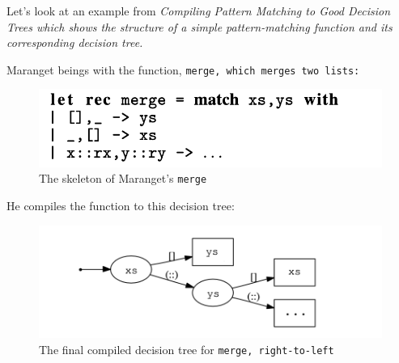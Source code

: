 \documentclass[manuscript,screen,review, 12pt, nonacm]{acmart}
\begin{document}
    Let's look at an example from \it{Compiling Pattern Matching to Good
    Decision Trees} which shows the structure of a simple pattern-matching
    function and its corresponding decision tree.

    Maranget beings with the function, \tt{merge}, which merges two lists: 

    \begin{figure}[H]
        \includegraphics[scale=0.7]{../images/merge.png}
        \caption{The skeleton of Maranget's \tt{merge}}
    \end{figure}





    He compiles the function to this decision tree: 

    \begin{figure}[H]
        \includegraphics[scale=0.7]{../images/dtree.png}
        \caption{The final compiled decision tree for \tt{merge}, right-to-left}
    \end{figure}
\end{document}

